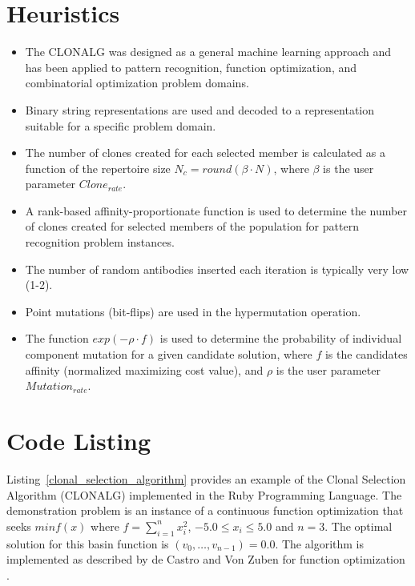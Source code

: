 \documentclass[a4paper, 11pt]{article}
\begin{document}
\section{Heuristics}
\label{sec:heuristics}
\begin{itemize}
	\item The CLONALG was designed as a general machine learning approach and has been applied to pattern recognition, function optimization, and combinatorial optimization problem domains.
	\item Binary string representations are used and decoded to a representation suitable for a specific problem domain.
	\item The number of clones created for each selected member is calculated as a function of the repertoire size $N_c=round(\beta \cdot N)$, where $\beta$ is the user parameter $Clone_{rate}$. 
	\item A rank-based affinity-proportionate function is used to determine the number of clones created for selected members of the population for pattern recognition problem instances.
	\item The number of random antibodies inserted each iteration is typically very low (1-2).
	\item Point mutations (bit-flips) are used in the hypermutation operation.
	\item The function $exp(-\rho \cdot f)$ is used to determine the probability of individual component mutation for a given candidate solution, where $f$ is the candidates affinity (normalized maximizing cost value), and $\rho$ is the user parameter $Mutation_{rate}$.
\end{itemize}

\section{Code Listing}
\label{sec:code}
Listing~\ref{clonal_selection_algorithm} provides an example of the Clonal Selection Algorithm (CLONALG) implemented in the Ruby Programming Language.
The demonstration problem is an instance of a continuous function optimization that seeks $min f(x)$ where $f=\sum_{i=1}^n x_{i}^2$, $-5.0\leq x_i \leq 5.0$ and $n=3$. The optimal solution for this basin function is $(v_0,\ldots,v_{n-1})=0.0$.
The algorithm is implemented as described by de Castro and Von Zuben for function optimization \cite{Castro2002a}.
\end{document}
